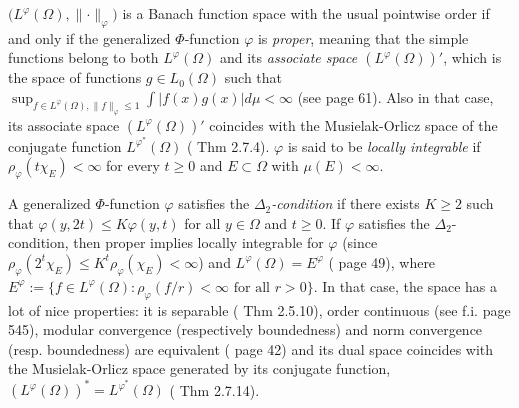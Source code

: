 \documentclass[11pt,a4paper]{amsart}
\newcommand{\lphi}{{L^{\varphi}(\Omega)}}
\newcommand{\lphiconj}{{L^{\varphi^*}(\Omega)}}
\newcommand\boldred[1]{\textcolor{red}{\textbf{#1}}}
\begin{document}
$\big(\lphi,\lVert\cdot\rVert_{\varphi}\big)$ is a Banach function space with the usual pointwise order if and only if the generalized $\Phi$-function $\varphi$ is {\it proper}, meaning that the simple functions belong to both $\lphi$ and its {\it associate space $(\lphi)'$}, which is the space of functions $g\in L_0(\Omega)$ such that $\sup_{f\in \lphi, \lVert f\rVert_\varphi\leq 1} \int \vert f(x)g(x)\vert d\mu<\infty$ (see \cite{DHHR} page 61). Also in that case, its associate space $(\lphi)'$ coincides with the Musielak-Orlicz space of the conjugate function $\lphiconj$ (\cite{DHHR} Thm 2.7.4). $\varphi$ is said to be {\it locally integrable} if $\rho_{\varphi}(t\chi_{E})<\infty$ for every $t\geq 0$ and $E\subset\Omega$ with $\mu(E)<\infty$.


A generalized $\Phi$-function $\varphi$ satisfies the {\it $\Delta_2$-condition} if there exists $K\geq 2$ such that $\varphi(y,2t)\leq K\varphi(y,t)$ for all $y\in\Omega$ and $t\geq 0$. If $\varphi$ satisfies the $\Delta_2$-condition, then proper implies locally integrable for $\varphi$ (since $\rho_{\varphi}(2^t\chi_E)\leq K^t \rho_{\varphi}(\chi_E)<\infty$) and $\lphi=E^\varphi$ (\cite{DHHR} page 49), where $E^{\varphi}:=\{f\in \lphi: \rho_{\varphi}(f/r)<\infty \text{ for all } r>0\}$. %
In that case, the space has a lot of nice properties: it is separable (\cite{DHHR} Thm 2.5.10), order continuous (see f.i. \cite{Hudzik} page 545), modular convergence (respectively boundedness) and norm convergence (resp. boundedness) are equivalent (\cite{DHHR} page 42) and its dual space coincides with the Musielak-Orlicz space generated by its conjugate function, $(\lphi)^*=L^{\varphi^*}(\Omega)$ (\cite{DHHR} Thm 2.7.14).
\end{document}
